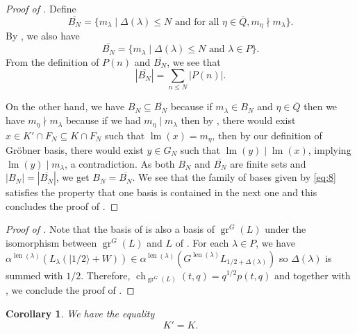 \documentclass[12pt, a4paper]{article}
\newtheorem{corollary}[theorem]{Corollary}
\theoremstyle{remark}
\DeclareMathOperator{\gr}{gr}
\DeclareMathOperator{\ch}{ch}
\DeclareMathOperator{\lm}{lm}
\DeclareMathOperator{\len}{len}
\newcommand{\vachalf}{|1/2\rangle}
\begin{document}
\begin{proof}[Proof of ]
  Define
  \begin{equation*}
    \overline{B_N} = \{m_\lambda \mid \Delta(\lambda) \le N\text{ and for all }\eta \in \overline{Q}, m_\eta \nmid m_\lambda\}.
  \end{equation*}
  By , we also have
  \begin{equation*}
    \overline{B_N} = \{m_\lambda \mid \Delta(\lambda) \le N\text{ and }\lambda \in P\}.
  \end{equation*}
  From the definition of $P(n)$ and $\overline{B_N}$, we see that
  \begin{equation*}
    |\overline{B_N}| = \sum_{n \le N}|P(n)|.
  \end{equation*}
  
  On the other hand, we have $B_N \subseteq \overline{B_N}$ because if $m_\lambda \in B_N$ and $\eta \in \overline{Q}$ then we have $m_\eta \nmid m_\lambda$ because if we had $m_\eta \mid m_\lambda$ then by , there would exist $x \in K' \cap F_N \subseteq K \cap F_N$ such that $\lm(x) = m_\eta$, then by our definition of Gr\"{o}bner basis, there would exist $y \in G_N$ such that $\lm(y) \mid \lm(x)$, implying $\lm(y) \mid m_\lambda$, a contradiction.
  As both $B_N$ and $\overline{B_N}$ are finite sets and $|B_N| = |\overline{B_N}|$, we get $B_N = \overline{B_N}$.
  We see that the family of bases given by \eqref{eq:8} satisfies the property that one basis is contained in the next one and this concludes the proof of .
\end{proof}

\begin{proof}[Proof of ]
  Note that the basis of  is also a basis of $\gr^G(L)$ under the isomorphism between $\gr^G(L)$ and $L$ of .
  For each $\lambda \in P$, we have $\alpha^{\len(\lambda)}(L_\lambda(\vachalf + W)) \in \alpha^{\len(\lambda)}(G^{\len(\lambda)}L_{1/2 + \Delta(\lambda)})$ so $\Delta(\lambda)$ is summed with $1/2$.
  Therefore, $\ch_{\gr^G(L)}(t, q) = q^{1/2}p(t,q)$ and together with , we conclude the proof of .
\end{proof}

\begin{corollary}
  \label{crl:1}
  We have the equality
  \begin{equation*}
    K' = K.
  \end{equation*}
\end{corollary}
\end{document}
